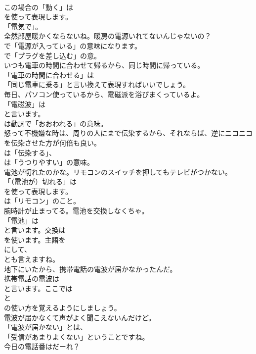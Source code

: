\documentclass[8pt]{extreport}
\begin{document}
\begin{CJK}{UTF8}{min}
\\	この場合の「動く」は
\\	を使って表現します。
\\	「電気で」。	
\\	全然部屋暖かくならないね。暖房の電源いれてないんじゃないの？ 
\\	で「電源が入っている」の意味になります。
\\	で「プラグを差し込む」の意。	
\\	いつも電車の時間に合わせて帰るから、同じ時間に帰っている。 
\\	「電車の時間に合わせる」は
\\	「同じ電車に乗る」と言い換えて表現すればいいでしょう。	
\\	毎日、パソコン使っているから、電磁派を浴びまくっているよ。 
\\	「電磁波」は
\\	と言います。
\\	は動詞で「おおわれる」の意味。	
\\	怒って不機嫌な時は、周りの人にまで伝染するから、それならば、逆にニコニコを伝染させた方が何倍も良い。 
\\	は「伝染する」、
\\	は「うつりやすい」の意味。	
\\	電池が切れたのかな。リモコンのスイッチを押してもテレビがつかない。 
\\	「（電池が）切れる」は
\\	を使って表現します。
\\	は「リモコン」のこと。	
\\	腕時計が止まってる。電池を交換しなくちゃ。 
\\	「電池」は
\\	と言います。交換は
\\	を使います。主語を
\\	にして、
\\	とも言えますね。	
\\	地下にいたから、携帯電話の電波が届かなかったんだ。 
\\	携帯電話の電波は
\\	と言います。ここでは
\\	と
\\	の使い方を覚えるようにしましょう。	
\\	電波が届かなくて声がよく聞こえないんだけど。 
\\	「電波が届かない」とは、
\\	「受信があまりよくない」ということですね。	
\\	今日の電話番はだーれ？ 

\end{CJK}
\end{document}
